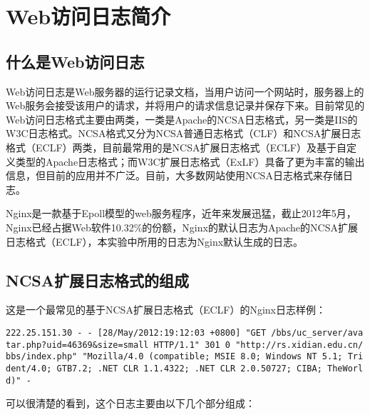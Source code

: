 	
\section[Web访问日志简介]{Web访问日志简介\cite{site:weblog}}
\subsection{什么是Web访问日志}
Web访问日志是Web服务器的运行记录文档，当用户访问一个网站时，服务器上的Web服务会接受该用户的请求，并将用户的请求信息记录并保存下来。目前常见的Web访问日志格式主要由两类，一类是Apache的NCSA日志格式，另一类是IIS的W3C日志格式。NCSA格式又分为NCSA普通日志格式（CLF）和NCSA扩展日志格式（ECLF）两类，目前最常用的是NCSA扩展日志格式（ECLF）及基于自定义类型的Apache日志格式；而W3C扩展日志格式（ExLF）具备了更为丰富的输出信息，但目前的应用并不广泛。目前，大多数网站使用NCSA日志格式来存储日志。

Nginx是一款基于Epoll模型的web服务程序\cite{site:nginx}，近年来发展迅猛，截止2012年5月，Nginx已经占据Web软件10.32\%的份额\cite{site:netcraft_nginx}，Nginx的默认日志为Apache的NCSA扩展日志格式（ECLF），本实验中所用的日志为Nginx默认生成的日志。

\subsection{NCSA扩展日志格式的组成}
这是一个最常见的基于NCSA扩展日志格式（ECLF）的Nginx日志样例：

\begin{verbatim}
222.25.151.30 - - [28/May/2012:19:12:03 +0800] "GET /bbs/uc_server/ava
tar.php?uid=46369&size=small HTTP/1.1" 301 0 "http://rs.xidian.edu.cn/
bbs/index.php" "Mozilla/4.0 (compatible; MSIE 8.0; Windows NT 5.1; Tri
dent/4.0; GTB7.2; .NET CLR 1.1.4322; .NET CLR 2.0.50727; CIBA; TheWorl
d)" -
\end{verbatim}

可以很清楚的看到，这个日志主要由以下几个部分组成：

